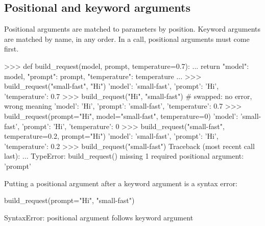 \subsection{Positional and keyword arguments}

Positional arguments are matched to parameters by position. Keyword arguments are matched by
name, in any order. In a call, positional arguments must come first.

\begin{center}
\end{center}

\begin{pycode}
>>> def build_request(model, prompt, temperature=0.7):
...     return {"model": model, "prompt": prompt, "temperature": temperature}
...
>>> build_request("small-fast", "Hi")
{'model': 'small-fast', 'prompt': 'Hi', 'temperature': 0.7}
>>> build_request("Hi", "small-fast")     # swapped: no error, wrong meaning
{'model': 'Hi', 'prompt': 'small-fast', 'temperature': 0.7}
>>> build_request(prompt="Hi", model="small-fast", temperature=0)
{'model': 'small-fast', 'prompt': 'Hi', 'temperature': 0}
>>> build_request("small-fast", temperature=0.2, prompt="Hi")
{'model': 'small-fast', 'prompt': 'Hi', 'temperature': 0.2}
>>> build_request("small-fast")
Traceback (most recent call last):
  ...
TypeError: build_request() missing 1 required positional argument: 'prompt'
\end{pycode}

Putting a positional argument after a keyword argument is a syntax error:

\begin{pycode}
build_request(prompt="Hi", "small-fast")
\end{pycode}
\begin{rawcode}
SyntaxError: positional argument follows keyword argument
\end{rawcode}

